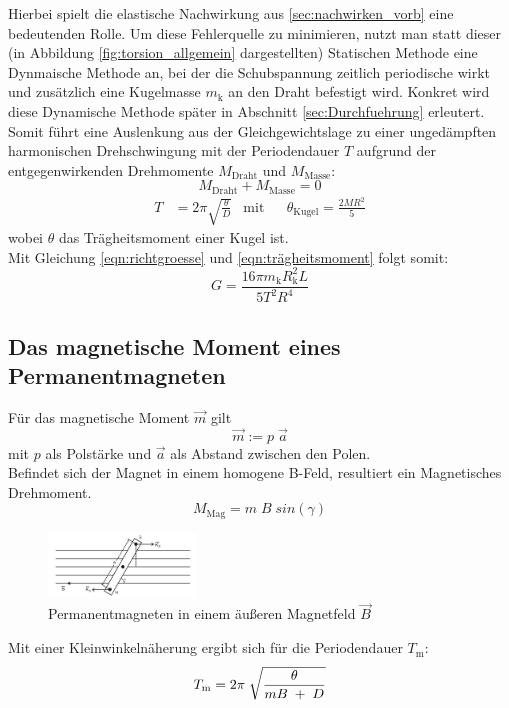 Hierbei spielt die elastische Nachwirkung aus \ref{sec:nachwirken_vorb} eine bedeutenden Rolle.
Um diese Fehlerquelle zu minimieren, nutzt man statt dieser (in Abbildung \ref{fig:torsion_allgemein} dargestellten) 
Statischen Methode eine Dynmaische
Methode an, bei der die Schubspannung zeitlich periodische wirkt und zusätzlich eine Kugelmasse $m_\text{k}$ 
an den Draht befestigt wird.
Konkret wird diese Dynamische Methode später in Abschnitt \ref{sec:Durchfuehrung} erleutert.\\
\newpage
Somit führt eine Auslenkung aus der Gleichgewichtslage zu einer ungedämpften harmonischen
Drehschwingung mit der Periodendauer $T$ aufgrund der entgegenwirkenden Drehmomente $M_\text{Draht}$ 
und $M_\text{Masse}$:
\begin{equation}
    M_\text{Draht} + M_\text{Masse} = 0
\end{equation}
\begin{align}
    T & = 2\pi \sqrt{\frac{\theta}{D}} & \mathrm{mit} & &  \theta_\text{Kugel} = \frac{2MR^2}{5}
    \label{eqn:trägheitsmoment}
\end{align}
wobei $\theta$ das Trägheitsmoment einer Kugel ist.\\

Mit Gleichung \ref{eqn:richtgroesse} und \ref{eqn:trägheitsmoment} folgt somit:
\begin{equation}
    G=\frac{16 \pi m_\text{k}R^2_\text{k}L}{5T^2R^4}
    \label{eqn:schubmodul_formel}
\end{equation}


\subsection{Das magnetische Moment eines Permanentmagneten}
Für das magnetische Moment $\vec{m}$ gilt
\begin{equation}
    \vec{m}:=p\;\vec{a}
\end{equation}
mit $p$ als Polstärke und $\vec{a}$ als Abstand zwischen den Polen.\\
Befindet sich der Magnet in einem homogene B-Feld, resultiert ein Magnetisches Drehmoment.
\begin{equation}
    M_\text{Mag} = m\;B\;sin(\gamma)
\end{equation}

\begin{figure}[h]
    \centering
    \includegraphics[width=0.35\textwidth, height=0.15\textwidth]{bilder/Drehmoment.jpg}
    \caption{Permanentmagneten in einem äußeren Magnetfeld $\vec{B}$}        
    \label{fig:drehmoment}
\end{figure}

Mit einer Kleinwinkelnäherung ergibt sich für die Periodendauer $T_\text{m}$:
\begin{equation}
    T_\text{m} = 2\pi\;\sqrt{\frac{\theta}{mB\;+\;D}}\\
\end{equation}

